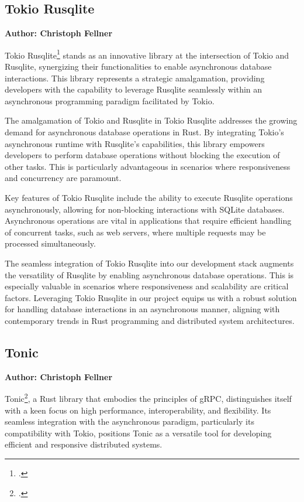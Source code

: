 \subsection{Tokio Rusqlite}
\textbf{Author: Christoph Fellner}

Tokio Rusqlite\footcite{tokiolite} stands as an innovative library at the intersection of Tokio and Rusqlite, synergizing their functionalities to enable 
asynchronous database interactions. This library represents a strategic amalgamation, providing developers with the capability to leverage Rusqlite seamlessly 
within an asynchronous programming paradigm facilitated by Tokio.\newline

The amalgamation of Tokio and Rusqlite in Tokio Rusqlite addresses the growing demand for asynchronous database operations in Rust. By integrating Tokio's 
asynchronous runtime with Rusqlite's capabilities, this library empowers developers to perform database operations without blocking the execution of other tasks.
This is particularly advantageous in scenarios where responsiveness and concurrency are paramount.\newline

Key features of Tokio Rusqlite include the ability to execute Rusqlite operations asynchronously, allowing for non-blocking interactions with SQLite databases. 
Asynchronous operations are vital in applications that require efficient handling of concurrent tasks, such as web servers, where multiple requests may be 
processed simultaneously.\newline

The seamless integration of Tokio Rusqlite into our development stack augments the versatility of Rusqlite by enabling asynchronous database operations. This is 
especially valuable in scenarios where responsiveness and scalability are critical factors. Leveraging Tokio Rusqlite in our project equips us with a robust 
solution for handling database interactions in an asynchronous manner, aligning with contemporary trends in Rust programming and distributed system 
architectures.

\subsection{Tonic}
\textbf{Author: Christoph Fellner}

Tonic\footcite{tonic}, a Rust library that embodies the principles of gRPC, distinguishes itself with a keen focus on high performance, interoperability, and 
flexibility. Its seamless integration with the asynchronous paradigm, particularly its compatibility with Tokio, positions Tonic as a versatile tool for 
developing efficient and responsive distributed systems.\newline

